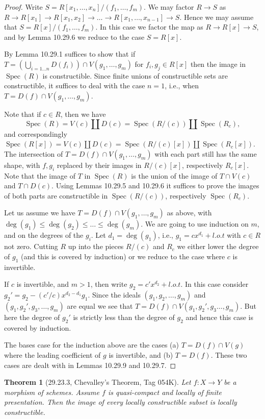 \documentclass[UTF8,11pt]{ctexart}
\newtheorem*{theorem}{Theorem}
\theoremstyle{definition}
\DeclareMathOperator{\Spec}{Spec}
\begin{document}
\begin{proof}
Write $S=R[x_1,\ldots,x_n]/(f_1,\ldots,f_m)$. We may factor $R\to S$ as $R\to R[x_1]\to R[x_1,x_2]\to\ldots\to R[x_1,\ldots,x_{n-1}]\to S$. Hence we may assume that $S=R[x]/(f_1,\ldots,f_m)$. In this case we factor the map as $R\to R[x]\to S$, and by Lemma 10.29.6 we reduce to the case $S=R[x]$.

By Lemma 10.29.1 suffices to show that if $T=(\bigcup_{i=1\ldots n}D(f_i))\cap V(g_1,\ldots,g_m)$ for $f_i,g_j\in R[x]$ then the image in $\Spec(R)$ is constructible. Since finite unions of constructible sets are constructible, it suffices to deal with the case $n=1$, i.e., when $T=D(f)\cap V(g_1,\ldots,g_m)$.

Note that if $c\in R$, then we have
\[\Spec(R)=V(c)\amalg D(c)=\Spec(R/(c))\amalg\Spec(R_c),\]
and correspondingly $\Spec(R[x])=V(c)\amalg D(c)=\Spec(R/(c)[x])\amalg\Spec(R_c[x])$. The intersection of $T=D(f)\cap V(g_1,\ldots,g_m)$ with each part still has the same shape, with $f,g_i$ replaced by their images in $R/(c)[x]$, respectively $R_c[x]$. Note that the image of $T$ in $\Spec(R)$ is the union of the image of $T\cap V(c)$ and $T\cap D(c)$. Using Lemmas 10.29.5 and 10.29.6 it suffices to prove the images of both parts are constructible in $\Spec(R/(c))$, respectively $\Spec(R_c)$.

Let us assume we have $T=D(f)\cap V(g_1,\ldots,g_m)$ as above, with $\deg(g_1)\leq\deg(g_2)\leq\ldots\leq\deg(g_m)$. We are going to use induction on $m$, and on the degrees of the $g_i$. Let $d_1=\deg(g_1)$, i.e., $g_1=cx^{d_1}+l.o.t$ with $c\in R$ not zero. Cutting $R$ up into the pieces $R/(c)$ and $R_c$ we either lower the degree of $g_1$ (and this is covered by induction) or we reduce to the case where $c$ is invertible.

If $c$ is invertible, and $m>1$, then write $g_2=c'x^{d_2}+l.o.t$. In this case consider $g_2'=g_2-(c'/c)x^{d_2-d_1}g_1$. Since the ideals $(g_1,g_2,\ldots,g_m)$ and $(g_1,g_2',g_3,\ldots,g_m)$ are equal we see that $T=D(f)\cap V(g_1,g_2',g_3\ldots,g_m)$. But here the degree of $g_2'$ is strictly less than the degree of $g_2$ and hence this case is covered by induction.

The bases case for the induction above are the cases (a) $T=D(f)\cap V(g)$ where the leading coefficient of $g$ is invertible, and (b) $T=D(f)$. These two cases are dealt with in Lemmas 10.29.9 and 10.29.7.
\end{proof}
\begin{theorem}[29.23.3, Chevalley's Theorem, Tag 054K]
Let $f:X\to Y$ be a morphism of schemes. Assume $f$ is quasi-compact and locally of finite presentation. Then the image of every locally constructible subset is locally constructible.
\end{theorem}
\end{document}
